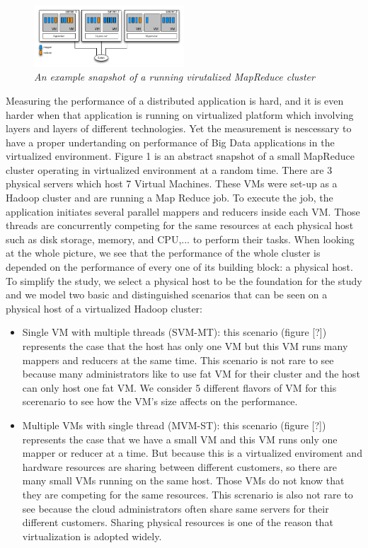 \documentclass{acmsig}
\begin{document}
\begin{figure}[htbp]
    \centering
    \includegraphics[width=0.5\textwidth]{figures/cluster_snapshot.png}
    \caption{\textit{An example snapshot of a running virutalized MapReduce cluster}}
    \label{cluster_snapshot}
\end{figure}

Measuring the performance of a distributed application is hard, and it is even harder when that application is running on virtualized platform which involving layers and layers of different technologies. Yet the measurement is nescessary to have a proper undertanding on performance of Big Data applications in the virtualized environment. Figure 1 is an abstract snapshot of a small MapReduce cluster operating in virtualized environment at a random time. There are 3 physical servers which host 7 Virtual Machines. These VMs were set-up as a Hadoop cluster and are running a Map Reduce job. To execute the job, the application initiates several parallel mappers and reducers inside each VM. Those threads are concurrently competing for the same resources at each physical host such as disk storage, memory, and CPU,... to perform their tasks. When looking at the whole picture, we see that the performance of the whole cluster is depended on the performance of every one of its building block: a physical host. To simplify the study, we select a physical host to be the foundation for the study and we model two basic and distinguished scenarios that can be seen on a physical host of a virtualized Hadoop cluster:
\begin{itemize} 
\item Single VM with multiple threads (SVM-MT): this scenario (figure [?]) represents the case that the host has only one VM but this VM runs many mappers and reducers at the same time. This scenario is not rare to see because many administrators like to use fat VM for their cluster and the host can only host one fat VM. We consider 5 different flavors of VM for this scerenario to see how the VM's size affects on the performance.
\item Multiple VMs with single thread (MVM-ST): this scenario (figure [?]) represents the case that we have a small VM and this VM runs only one mapper or reducer at a time. But because this is a virtualized enviroment and hardware resources are sharing between different customers, so there are many small VMs running on the same host. Those VMs do not know that they are competing for the same resources. This screnario is also not rare to see because the cloud administrators often share same servers for their different customers. Sharing physical resources is one of the reason that virtualization is adopted widely.
\end{itemize}
\end{document}
